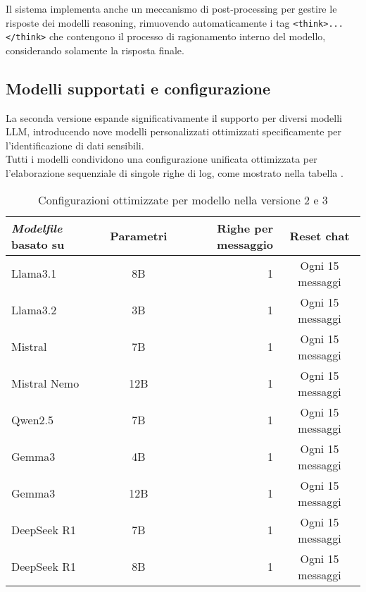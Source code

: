 \documentclass[12pt]{report}
\begin{document}
Il sistema implementa anche un meccanismo di post-processing per gestire le risposte dei modelli reasoning, rimuovendo automaticamente i tag \texttt{<think>...</think>} che contengono il processo di ragionamento interno del modello, considerando solamente la risposta finale.

\subsection{Modelli supportati e configurazione}
\label{subsec:ver2_modelli_supportati}

La seconda versione espande significativamente il supporto per diversi modelli LLM, introducendo nove modelli personalizzati ottimizzati specificamente per l'identificazione di dati sensibili. \\
Tutti i modelli condividono una configurazione unificata ottimizzata per l'elaborazione sequenziale di singole righe di log, come mostrato nella tabella .

\begin{table}[h!]
    \centering
    \begin{tabular}{|l|c|r|c|}
        \hline
        \textbf{\textit{Modelfile} basato su} & \textbf{Parametri} & \textbf{Righe per messaggio} & \textbf{Reset chat} \\ \hline
        Llama3.1                              & 8B                 & 1                            & Ogni 15 messaggi    \\ \hline
        Llama3.2                              & 3B                 & 1                            & Ogni 15 messaggi    \\ \hline
        Mistral                               & 7B                 & 1                            & Ogni 15 messaggi    \\ \hline
        Mistral Nemo                          & 12B                & 1                            & Ogni 15 messaggi    \\ \hline
        Qwen2.5                               & 7B                 & 1                            & Ogni 15 messaggi    \\ \hline
        Gemma3                                & 4B                 & 1                            & Ogni 15 messaggi    \\ \hline
        Gemma3                                & 12B                & 1                            & Ogni 15 messaggi    \\ \hline
        DeepSeek R1                           & 7B                 & 1                            & Ogni 15 messaggi    \\ \hline
        DeepSeek R1                           & 8B                 & 1                            & Ogni 15 messaggi    \\ \hline
    \end{tabular}
    \caption{Configurazioni ottimizzate per modello nella versione 2 e 3}
    \label{tab:modelli_llm_ver2}
\end{table}
\end{document}
